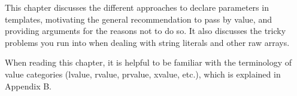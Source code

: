 This chapter discusses the different approaches to declare parameters in templates, motivating the general recommendation to pass by value, and providing arguments for the reasons not to do so. It also discusses the tricky problems you run into when dealing with string literals and other raw arrays.

When reading this chapter, it is helpful to be familiar with the terminology of value categories (lvalue, rvalue, prvalue, xvalue, etc.), which is explained in Appendix B.





























